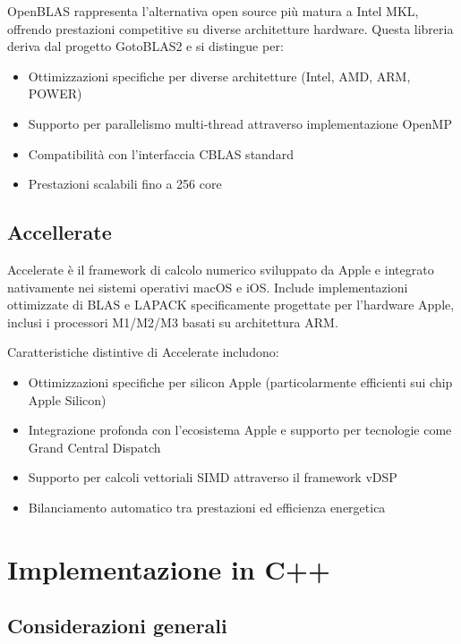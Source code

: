OpenBLAS rappresenta l'alternativa open source più matura a Intel MKL, offrendo prestazioni competitive su diverse architetture hardware. 
Questa libreria deriva dal progetto GotoBLAS2 e si distingue per:

\begin{itemize}
    \item Ottimizzazioni specifiche per diverse architetture (Intel, AMD, ARM, POWER)
    \item Supporto per parallelismo multi-thread attraverso implementazione OpenMP
    \item Compatibilità con l'interfaccia CBLAS standard
    \item Prestazioni scalabili fino a 256 core
\end{itemize}

\subsection{Accellerate}

Accelerate è il framework di calcolo numerico sviluppato da Apple e integrato nativamente nei sistemi operativi macOS e iOS. Include implementazioni ottimizzate di BLAS e LAPACK specificamente progettate per l'hardware Apple, inclusi i processori M1/M2/M3 basati su architettura ARM.

Caratteristiche distintive di Accelerate includono:

\begin{itemize}
    \item Ottimizzazioni specifiche per silicon Apple (particolarmente efficienti sui chip Apple Silicon)
    \item Integrazione profonda con l'ecosistema Apple e supporto per tecnologie come Grand Central Dispatch
    \item Supporto per calcoli vettoriali SIMD attraverso il framework vDSP
    \item Bilanciamento automatico tra prestazioni ed efficienza energetica
\end{itemize}

\section{Implementazione in C++}

\subsection{Considerazioni generali} 

